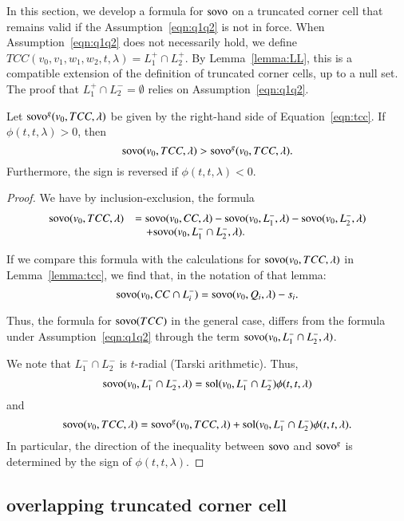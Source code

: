 In this section, we develop a formula for ${\operatorname{sovo}}$ on 
a truncated corner cell that remains valid if the 
Assumption~\ref{eqn:q1q2} is not in force.
When Assumption~\ref{eqn:q1q2} does not necessarily hold, we
define $TCC(v_0,v_1,w_1,w_2,t,\lambda) = L_1^+ \cap L_2^+$.
By Lemma~\ref{lemma:LL}, 
this is a compatible extension of the definition
of truncated corner cells, up to a null set.
The proof that $L_1^+\cap L_2^- = \emptyset$ 
relies on Assumption~\ref{eqn:q1q2}.


\begin{lemma} Let ${\operatorname{sovo}}^g(v_0,TCC,\lambda)$ be given
by the right-hand side of Equation~\ref{eqn:tcc}.
If $\phi(t,t,\lambda) > 0$, then
   $$
   {\operatorname{sovo}}(v_0,TCC,\lambda) > {\operatorname{sovo}}^g(v_0,TCC,\lambda).
   $$
Furthermore, the sign is reversed if $\phi(t,t,\lambda) < 0$.
\end{lemma}

\begin{proof}
We have by inclusion-exclusion, the formula
$$
\begin{array}{lll}
{\operatorname{sovo}}(v_0,TCC,\lambda) &=
{\operatorname{sovo}}(v_0,CC,\lambda) -
{\operatorname{sovo}}(v_0, L_1^-,\lambda) -
{\operatorname{sovo}}(v_0, L_2^-,\lambda) \\
 &\quad +
{\operatorname{sovo}}(v_0, L_1^- \cap L_2^-,\lambda).
\end{array}
$$

If we compare this formula with the calculations for 
${\operatorname{sovo}}(v_0,TCC,\lambda)$ in Lemma~\ref{lemma:tcc}, 
we find that, in the notation of that lemma:
$$
{\operatorname{sovo}}(v_0,CC\cap L_i^-) = {\operatorname{sovo}}(v_0,Q_i,\lambda) - s_i.
$$

Thus, the formula for ${\operatorname{sovo}}(TCC)$ in the general case,
differs from the formula under Assumption~\ref{eqn:q1q2} through
the term ${\operatorname{sovo}}(v_0,L_1^-\cap L_2^-,\lambda)$.

We note that $L_1^-\cap L_2^-$ is $t$-radial 
(Tarski arithmetic).  Thus,
$$
{\operatorname{sovo}}(v_0,L_1^-\cap L_2^-,\lambda) =
\operatorname{sol}(v_0, L_1^-\cap L_2^-)\phi(t,t,\lambda)
$$
and
$$
{\operatorname{sovo}}(v_0,TCC,\lambda) = {\operatorname{sovo}}^g(v_0,TCC,\lambda) +
   \operatorname{sol}(v_0,L_1^-\cap L_2^-) \phi(t,t,\lambda).
$$
In particular, the direction of the inequality between
${\operatorname{sovo}}$ and ${\operatorname{sovo}}^g$ is determined by the sign
of $\phi(t,t,\lambda)$.
\end{proof}



\subsection{overlapping truncated corner cell}




